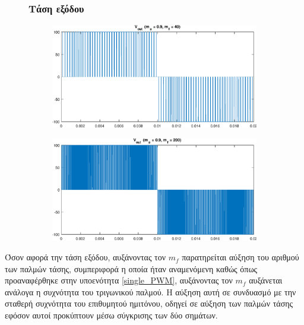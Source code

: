 \begin{figure}[h!]
	\subsubsection*{Τάση εξόδου}
	\begin{subfigure}{0.49\textwidth}
		\centering
		\includegraphics[width=1\textwidth]{Images/V_out_40}
	\end{subfigure}
	\begin{subfigure}{0.49\textwidth}
		\centering
		\includegraphics[width=1\textwidth]{Images/V_out_200}
	\end{subfigure}
\end{figure}
\noindent
Όσον αφορά την τάση εξόδου, αυξάνοντας τον $m_f$ παρατηρείται αύξηση του αριθμού των παλμών τάσης, συμπεριφορά  η οποία ήταν αναμενόμενη καθώς όπως προαναφέρθηκε στην υποενότητα \ref{single_PWM}, αυξάνοντας τον $m_f$ αυξάνεται ανάλογα η συχνότητα του τριγωνικού παλμού. Η αύξηση αυτή σε συνδυασμό με την σταθερή συχνότητα του επιθυμητού ημιτόνου, οδηγεί σε αύξηση των παλμών τάσης εφόσον αυτοί προκύπτουν μέσω σύγκρισης των δύο σημάτων.\\


